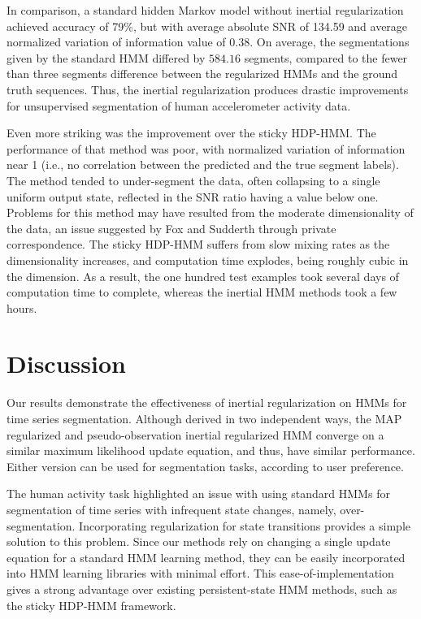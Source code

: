 \documentclass[letterpaper]{article}
\begin{document}
In comparison, a standard hidden Markov model without inertial regularization
achieved accuracy of 79\%, but with average absolute SNR of
134.59 and average normalized variation of information value of $0.38$. On
average, the segmentations given by the standard HMM differed by $584.16$
segments, compared to the fewer than three segments difference between the
regularized HMMs and the ground truth sequences. Thus, the inertial
regularization produces drastic improvements for unsupervised segmentation of
human accelerometer activity data.

Even more striking was the improvement over the sticky HDP-HMM. The performance of that method was poor, with
normalized variation of information near 1 (i.e., no correlation between
the predicted and the true segment labels). The method tended to
under-segment the data, often collapsing to a single uniform output state, reflected in the SNR ratio 
having a value below one. Problems for this method may 
have resulted from the moderate dimensionality of the data, an issue suggested by Fox and Sudderth through
private correspondence. The sticky HDP-HMM suffers from slow mixing rates as the
dimensionality increases, and computation time explodes, being roughly cubic in
the dimension. As a result, the one hundred test examples took several days of
computation time to complete, whereas the inertial HMM methods took a few hours.
\vspace{-0.2cm}
\section{Discussion}
\vspace{-0.1cm}
Our results demonstrate the effectiveness of inertial regularization on HMMs for
time series segmentation. Although derived in two independent ways, the MAP
regularized and pseudo-observation inertial regularized HMM converge on a
similar maximum likelihood update equation, and thus, have similar performance.
Either version can be used for segmentation tasks, according to user preference.

The human activity task highlighted an issue with using standard HMMs for
segmentation of time series with infrequent state changes, namely,
over-segmentation. Incorporating regularization for state transitions provides a
simple solution to this problem. Since our methods rely on changing a single
update equation for a standard HMM learning method, they can be easily
incorporated into HMM learning libraries with minimal effort. This
ease-of-implementation gives a strong advantage over existing persistent-state
HMM methods, such as the sticky HDP-HMM framework.
\end{document}
